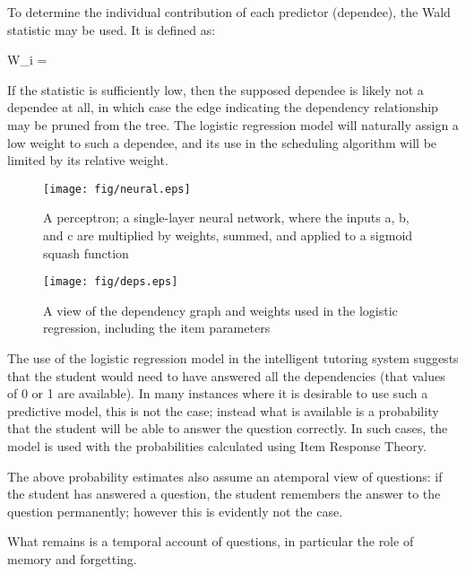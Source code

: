 To determine the individual contribution of each predictor (dependee), the
Wald statistic may be used.  It is defined as:

\begin{equations}
  W_i = 
\end{equations}

If the statistic is sufficiently low, then the supposed dependee is likely not
a dependee at all, in which case the edge indicating the dependency
relationship may be pruned from the tree.  The logistic regression model will
naturally assign a low weight to such a dependee, and its use in the scheduling
algorithm will be limited by its relative weight.

\begin{figure}[!p]
\label{fig:neural}
  \centering\texttt{[image: fig/neural.eps]}
\caption{A perceptron; a single-layer neural network, where the inputs a, b, and c
are multiplied by weights, summed, and applied to a sigmoid squash function}
\end{figure}

\begin{figure}[!p]
\label{fig:deps}
  \centering\texttt{[image: fig/deps.eps]}
\caption{A view of the dependency graph and weights used in the logistic regression,
including the item parameters}
\end{figure}

The use of the logistic regression model in the intelligent tutoring system
suggests that the student would need to have answered all the dependencies
(that values of 0 or 1 are available).  In many instances where it is desirable
to use such a predictive model, this is not the case; instead what is available
is a probability that the student will be able to answer the question
correctly.  In such cases, the model is used with the probabilities calculated
using Item Response Theory.

The above probability estimates also assume an atemporal view of questions: if
the student has answered a question, the student remembers the answer to the
question permanently; however this is evidently not the case.  

What remains is a temporal account of questions, in particular the role of
memory and forgetting.


